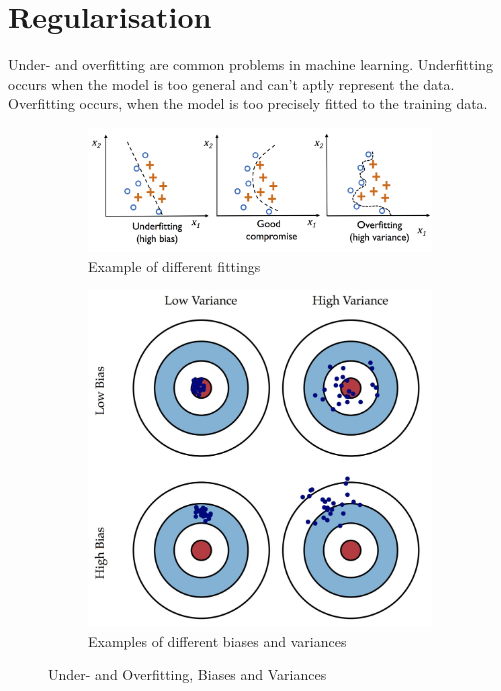 \documentclass[11pt]{article}
\begin{document}
\section{Regularisation} \label{sec:Regularisation}
Under- and overfitting are common problems in machine learning. Underfitting occurs when the model is too general and can't aptly represent the data. Overfitting occurs, when the model is too precisely fitted to the training data.

\begin{figure}[htb!]
    \centering
    \begin{subfigure}{0.6\linewidth}
        \centering
        \includegraphics[keepaspectratio,width=\linewidth]{Pictures/under_and_overfitting}
        \caption{Example of different fittings}
        \label{fig:underoverfittingbiasvariance}
    \end{subfigure}
    \begin{subfigure}{0.6\linewidth}
        \centering
        \includegraphics[keepaspectratio,width=\linewidth]{Pictures/biases_and_variances}
        \caption{Examples of different biases and variances}
    \end{subfigure}
    \caption{Under- and Overfitting, Biases and Variances}
\end{figure}
\end{document}
